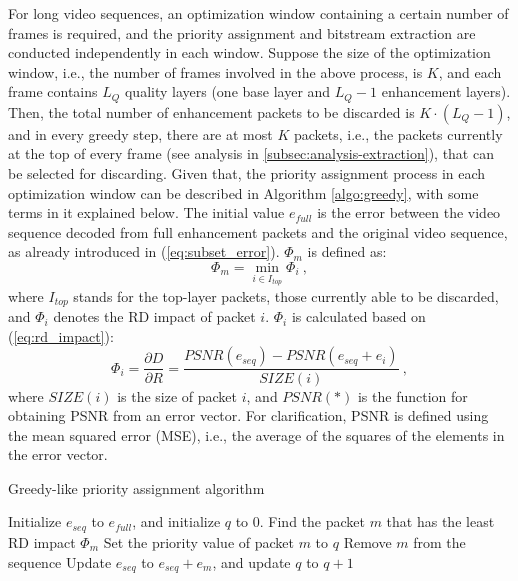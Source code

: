 \documentclass[journal,draftclsnofoot,onecolumn]{IEEEtran}
\begin{document}
For long video sequences, an optimization window containing a certain number of frames is required, and the priority assignment and bitstream extraction are conducted independently in each window. Suppose the size of the optimization window, i.e., the number of frames involved in the above process, is $K$, and each frame contains $L_Q$ quality layers (one base layer and $L_Q-1$ enhancement layers). Then, the total number of enhancement packets to be discarded is $K \cdot (L_Q-1)$, and in every greedy step, there are at most $K$ packets, i.e., the packets currently at the top of every frame (see analysis in \ref{subsec:analysis-extraction}), that can be selected for discarding. Given that, the priority assignment process in each optimization window can be described in Algorithm \ref{algo:greedy}, with some terms in it explained below. The initial value $e_{full}$ is the error between the video sequence decoded from full enhancement packets and the original video sequence, as already introduced in (\ref{eq:subset_error}). $\Phi_m$ is defined as:
\begin{equation}
\label{eq:R-D_impact_m}
\Phi_m = \min_{i \in I_{top}} \Phi_i \: ,
\end{equation}
where $I_{top}$ stands for the top-layer packets, those currently able to be discarded, and $\Phi_i$ denotes the RD impact of packet $i$. $\Phi_i$ is calculated based on (\ref{eq:rd_impact}):
\begin{equation}
\label{eq:R-D_impact_i}
\Phi_i = \dfrac{\partial D}{\partial R} = \dfrac{PSNR(e_{seq}) - PSNR(e_{seq} + e_i)}{SIZE(i)} \:,
\end{equation}
where $SIZE(i)$ is the size of packet $i$, and $PSNR(*)$ is the function for obtaining PSNR from an error vector. For clarification, PSNR is defined using the mean squared error (MSE), i.e., the average of the squares of the elements in the error vector.

\begin{algorithm}
\caption{Greedy-like priority assignment algorithm}
\label{algo:greedy}
\begin{algorithmic}
    \STATE Initialize $e_{seq}$ to $e_{full}$, and initialize $q$ to 0.
		    \STATE Find the packet $m$ that has the least RD impact $\Phi_m$
		\ENDFOR
		\STATE Set the priority value of packet $m$ to $q$
		\STATE Remove $m$ from the sequence
		\STATE Update $e_{seq}$ to $e_{seq} + e_m$, and update $q$ to $q+1$
    \ENDWHILE
\end{algorithmic}
\end{algorithm}
\end{document}
